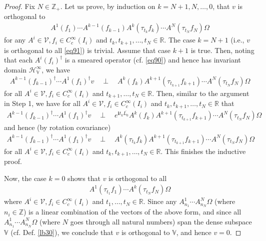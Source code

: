 \documentclass[12pt,b5paper,notitlepage]{article}
\theoremstyle{definition}
\theoremstyle{plain}
\newcommand{\mc}{\mathcal}
\newcommand{\ovl}{\overline}
\newcommand{\im}{\mathbf{i}}
\newcommand{\Vbb}{\mathbb V}
\newcommand{\Zbb}{\mathbb Z}
\newcommand{\Rbb}{\mathbb R}
\newcommand{\HV}{\mathcal H_{\mathbb V}}
\numberwithin{equation}{section}
\begin{document}
\begin{proof}
Fix $N\in\Zbb_+$. Let us prove, by induction on $k=N+1,N,\dots,0$, that $v$ is orthogonal to 
\begin{align*}
A^1(f_1)\cdots A^{k-1}(f_{k-1})A^k(\tau_{t_k}f_k)\cdots A^N(\tau_{t_N}f_N)\Omega
\end{align*}
for any $A^i\in\mc V,f_i\in C_c^\infty(I_i)$ and $t_k,t_{k+1},\dots,t_N\in\Rbb$. The case $k=N+1$ (i.e., $v$ is orthogonal to all \eqref{eq91}) is trivial. Assume that case $k+1$ is true. Then, noting that each $A^i(f_i)^\dagger$ is a smeared operator (cf. \eqref{eq90}) and hence has invariant domain $\HV^\infty$, we have
\begin{align*}
A^{k-1}(f_{k-1})^\dagger\cdots A^1(f_1)^\dagger v\quad\perp\quad A^k(f_k) A^{k+1}(\tau_{t_{k+1}}f_{k+1})\cdots A^N(\tau_{t_N}f_N)\Omega
\end{align*}
for all $A^i\in\mc V,f_i\in C_c^\infty(I_i)$ and $t_{k+1},\dots,t_N\in\Rbb$. Then, similar to the argument in Step 1, we have for all $A^i\in\mc V,f_i\in C_c^\infty(I_i)$ and $t_k,t_{k+1},\dots,t_N\in\Rbb$ that
\begin{align*}
A^{k-1}(f_{k-1})^\dagger\cdots A^1(f_1)^\dagger v\quad\perp\quad e^{\im t_k\ovl{L_0}}A^k(f_k) A^{k+1}(\tau_{t_{k+1}}f_{k+1})\cdots A^N(\tau_{t_N}f_N)\Omega
\end{align*}
and hence (by rotation covariance)
\begin{align*}
A^{k-1}(f_{k-1})^\dagger\cdots A^1(f_1)^\dagger v\quad\perp\quad A^k(\tau_{t_k}f_k) A^{k+1}(\tau_{t_{k+1}}f_{k+1})\cdots A^N(\tau_{t_N}f_N)\Omega
\end{align*}
for all $A^i\in\mc V,f_i\in C_c^\infty(I_i)$ and $t_k,t_{k+1},\dots,t_N\in\Rbb$. This finishes the inductive proof.

Now, the case $k=0$ shows that $v$ is orthogonal to all
\begin{align*}
A^1(\tau_{t_1}f_1)\cdots A^k(\tau_{t_N}f_N)\Omega
\end{align*}
where $A^i\in\mc V,f_i\in C_c^\infty(I_i)$ and $t_1,\dots,t_N\in\Rbb$. Since any $A^1_{n_1}\cdots A^N_{n_N}\Omega$ (where $n_i\in\Zbb$) is a linear combination of the vectors of the above form, and since all $A^1_{n_1}\cdots A^N_{n_N}\Omega$ (where $N$ goes through all natural numbers) span the dense subspace $\Vbb$ (cf. Def. \ref{lb30}), we conclude that $v$ is orthogonal to $\Vbb$, and hence $v=0$.
\end{proof}



\subsection{}
\end{document}
